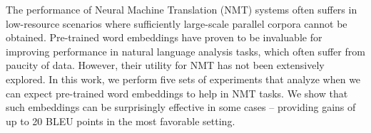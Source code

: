 The performance of Neural Machine Translation (NMT) systems often suffers in low-resource scenarios where sufficiently large-scale parallel corpora cannot be obtained. Pre-trained word embeddings have proven to be invaluable for improving performance in natural language analysis tasks, which often suffer from paucity of data. However, their utility for NMT has not been extensively explored. In this work, we perform five sets of experiments that analyze when we can expect pre-trained word embeddings to help in NMT tasks. We show that such embeddings can be surprisingly effective in some cases -- providing gains of up to 20 BLEU points in the most favorable setting.
